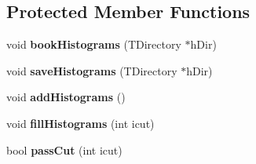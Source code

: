 \subsection*{Protected Member Functions}
\begin{DoxyCompactItemize}
\item 
\hypertarget{classToyNt__SROptimization_ad4e551a430e09c6d7073fa278f2ece9f}{
void {\bfseries bookHistograms} (TDirectory $\ast$hDir)}
\label{classToyNt__SROptimization_ad4e551a430e09c6d7073fa278f2ece9f}

\item 
\hypertarget{classToyNt__SROptimization_a5c2f11213febac79d8e5f86b8a025ff3}{
void {\bfseries saveHistograms} (TDirectory $\ast$hDir)}
\label{classToyNt__SROptimization_a5c2f11213febac79d8e5f86b8a025ff3}

\item 
\hypertarget{classToyNt__SROptimization_af405ecfcd93c32699ca6987957c0478c}{
void {\bfseries addHistograms} ()}
\label{classToyNt__SROptimization_af405ecfcd93c32699ca6987957c0478c}

\item 
\hypertarget{classToyNt__SROptimization_a592f0da185c98d7bf0b8b497c9e3eefd}{
void {\bfseries fillHistograms} (int icut)}
\label{classToyNt__SROptimization_a592f0da185c98d7bf0b8b497c9e3eefd}

\item 
\hypertarget{classToyNt__SROptimization_a425bb8039e76c7afd30ab5dc97e4fb66}{
bool {\bfseries passCut} (int icut)}
\label{classToyNt__SROptimization_a425bb8039e76c7afd30ab5dc97e4fb66}

\end{DoxyCompactItemize}
